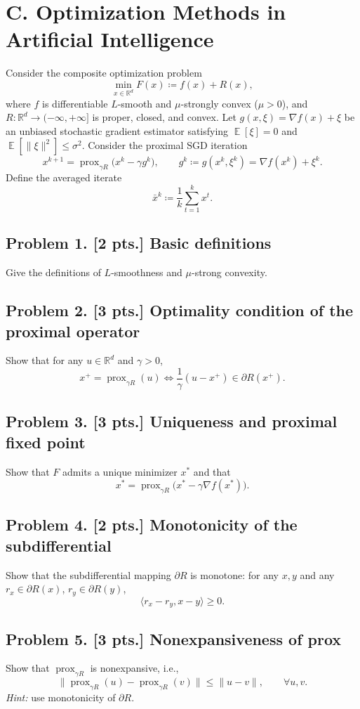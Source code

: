 \documentclass[11pt,a4paper]{article}
\DeclareMathOperator{\E}{\mathbb{E}}
\DeclareMathOperator{\prox}{prox}
\begin{document}
\section{C. Optimization Methods in Artificial Intelligence}

Consider the composite optimization problem
\[
\min_{x \in \mathbb{R}^{d}} F(x) \coloneqq f(x) + R(x),
\]
where $f$ is differentiable $L$-smooth and $\mu$-strongly convex ($\mu > 0$), and $R : \mathbb{R}^{d} \to (-\infty, +\infty]$ is proper, closed, and convex. Let $g(x, \xi) = \nabla f(x) + \xi$ be an unbiased stochastic gradient estimator satisfying $\E[\xi] = 0$ and $\E[\|\xi\|^{2}] \le \sigma^{2}$. Consider the proximal SGD iteration
\[
x^{k+1} = \prox_{\gamma R}\bigl(x^{k} - \gamma g^{k}\bigr), \qquad g^{k} \coloneqq g(x^{k}, \xi^{k}) = \nabla f(x^{k}) + \xi^{k}.
\]
Define the averaged iterate
\[
\bar{x}^{k} \coloneqq \frac{1}{k} \sum_{t=1}^{k} x^{t}.
\]

\subsection{Problem 1. [2 pts.] Basic definitions}
Give the definitions of $L$-smoothness and $\mu$-strong convexity.

\subsection{Problem 2. [3 pts.] Optimality condition of the proximal operator}
Show that for any $u \in \mathbb{R}^{d}$ and $\gamma > 0$,
\[
x^{+} = \prox_{\gamma R}(u) \iff \frac{1}{\gamma}(u - x^{+}) \in \partial R(x^{+}).
\]

\subsection{Problem 3. [3 pts.] Uniqueness and proximal fixed point}
Show that $F$ admits a unique minimizer $x^{*}$ and that
\[
x^{*} = \prox_{\gamma R}\bigl(x^{*} - \gamma \nabla f(x^{*})\bigr).
\]

\subsection{Problem 4. [2 pts.] Monotonicity of the subdifferential}
Show that the subdifferential mapping $\partial R$ is monotone: for any $x, y$ and any $r_x \in \partial R(x)$, $r_y \in \partial R(y)$,
\[
\langle r_x - r_y, x - y \rangle \ge 0.
\]

\subsection{Problem 5. [3 pts.] Nonexpansiveness of prox}
Show that $\prox_{\gamma R}$ is nonexpansive, i.e.,
\[
\bigl\| \prox_{\gamma R}(u) - \prox_{\gamma R}(v) \bigr\| \le \|u - v\|, \qquad \forall u, v.
\]
\textit{Hint:} use monotonicity of $\partial R$.
\end{document}
